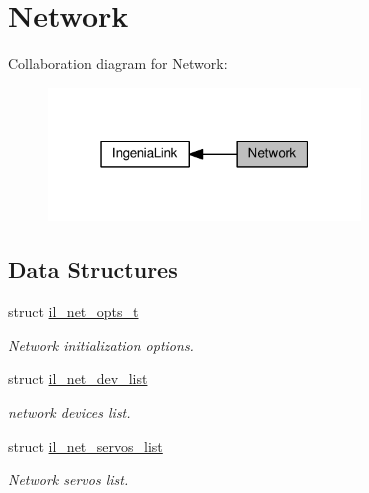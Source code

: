 \hypertarget{group__IL__NET}{}\section{Network}
\label{group__IL__NET}
Collaboration diagram for Network\+:\nopagebreak
\begin{figure}[H]
\begin{center}
\leavevmode
\includegraphics[width=235pt]{group__IL__NET}
\end{center}
\end{figure}
\subsection*{Data Structures}
\begin{DoxyCompactItemize}
\item 
struct \hyperlink{structil__net__opts__t}{il\+\_\+net\+\_\+opts\+\_\+t}
\begin{DoxyCompactList}\small\item\em Network initialization options. \end{DoxyCompactList}\item 
struct \hyperlink{structil__net__dev__list}{il\+\_\+net\+\_\+dev\+\_\+list}
\begin{DoxyCompactList}\small\item\em network devices list. \end{DoxyCompactList}\item 
struct \hyperlink{structil__net__servos__list}{il\+\_\+net\+\_\+servos\+\_\+list}
\begin{DoxyCompactList}\small\item\em Network servos list. \end{DoxyCompactList}\end{DoxyCompactItemize}
